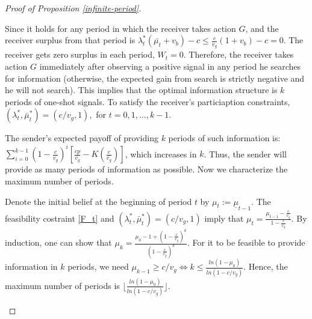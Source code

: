 \documentclass[11pt]{extarticle}
\newcommand{\lra}{\Leftrightarrow}
\begin{document}
\begin{proof}[Proof of Proposition \ref{infinite-period}]
\begin{enumerate}[(1)]
		Since it holds for any period in which the receiver takes action $G$, and the receiver surplus from that period is $\lambda_{t}^* (\bar{\mu_t} + v_b) - c \leq \frac{c}{v_g} (1 + v_b) - c = 0$. The receiver gets zero surplus in each period, $W_t =0$. Therefore, the receiver takes action $G$ immediately after observing a positive signal in any period he searches for information (otherwise, the expected gain from search is strictly negative and he will not search). This implies that the optimal information structure is $k$ periods of one-shot signals. To satisfy the receiver's particiaption constraints, $(\lambda_{t}^*,\bar{\mu}_{t}^*) = (c/v_g,1),$ for $t = 0,1,...,k-1$.
		
		The sender's expected payoff of providing $k$ periods of such information is: $\sum_{i=0}^{k-1}(1-\frac{c}{v_g})^i \left[\frac{cp}{v_g} - K(\frac{c}{v_g})\right]$, which increases in $k$. Thus, the sender will provide as many periods of information as possible. Now we characterize the maximum number of periods. 
		
		Denote the initial belief at the beginning of period $t$ by $\mu_t:= \underline{\mu}_{t-1}$. The feasibility costraint \eqref{F_t} and $(\lambda_{t}^*,\bar{\mu}_{t}^*) = (c/v_g,1)$ imply that $\mu_t = \frac{\mu_{t-1}-\frac{c}{v_g}}{1-\frac{c}{v_g}}$. By induction, one can show that $\mu_k = \frac{\mu_0 - 1 + (1-\frac{c}{v_g})^k}{(1-\frac{c}{v_g})^k}$. For it to be feasible to provide information in $k$ periods, we need $\mu_{k-1} \geq c/v_g \lra k \leq \frac{ln(1-\mu_0)}{ln(1-c/v_g)}$. Hence, the maximum number of periods is $\lfloor \frac{ln(1-\mu_0)}{ln(1-c/v_g)} \rfloor$.

		
		
		\begin{comment}
		Suppose the sender provides information for $k$ periods. In the last period, $t = k-1$, $(\lambda_{k-1}^*,\bar{\mu}_{k-1}^*) = (c/v_g,1)$ according to Proposition \ref{strategy1p}. The receiver gets zero expected surplus. Suppose the optimal signal in time $t$ is one-shot and $(\lambda_{t}^*,\bar{\mu}_{t}^*) = (c/v_g,1)$ for any $t \geq t'~(t' \geq 1)$, we want to show that the optimal signal in time $t=t'-1$ is one-shot and $(\lambda_{t'-1}^*,\bar{\mu}_{t'-1}^*) = (c/v_g,1)$. 
		

\end{comment}
\end{enumerate}
\end{proof}
\end{document}

